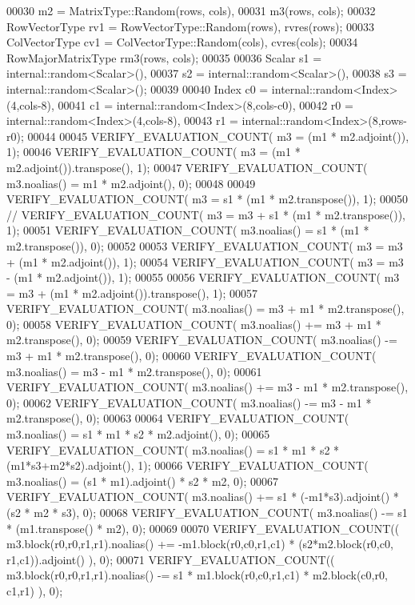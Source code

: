 \begin{DoxyCode}
00030                      m2 = MatrixType::Random(rows, cols),
00031                      m3(rows, cols);
00032   RowVectorType rv1 = RowVectorType::Random(rows), rvres(rows);
00033   ColVectorType cv1 = ColVectorType::Random(cols), cvres(cols);
00034   RowMajorMatrixType rm3(rows, cols);
00035 
00036   Scalar s1 = internal::random<Scalar>(),
00037          s2 = internal::random<Scalar>(),
00038          s3 = internal::random<Scalar>();
00039 
00040   Index c0 = internal::random<Index>(4,cols-8),
00041         c1 = internal::random<Index>(8,cols-c0),
00042         r0 = internal::random<Index>(4,cols-8),
00043         r1 = internal::random<Index>(8,rows-r0);
00044 
00045   VERIFY\_EVALUATION\_COUNT( m3 = (m1 * m2.adjoint()), 1);
00046   VERIFY\_EVALUATION\_COUNT( m3 = (m1 * m2.adjoint()).transpose(), 1);
00047   VERIFY\_EVALUATION\_COUNT( m3.noalias() = m1 * m2.adjoint(), 0);
00048 
00049   VERIFY\_EVALUATION\_COUNT( m3 = s1 * (m1 * m2.transpose()), 1);
00050 \textcolor{comment}{//   VERIFY\_EVALUATION\_COUNT( m3 = m3 + s1 * (m1 * m2.transpose()), 1);}
00051   VERIFY\_EVALUATION\_COUNT( m3.noalias() = s1 * (m1 * m2.transpose()), 0);
00052 
00053   VERIFY\_EVALUATION\_COUNT( m3 = m3 + (m1 * m2.adjoint()), 1);
00054   VERIFY\_EVALUATION\_COUNT( m3 = m3 - (m1 * m2.adjoint()), 1);
00055 
00056   VERIFY\_EVALUATION\_COUNT( m3 = m3 + (m1 * m2.adjoint()).transpose(), 1);
00057   VERIFY\_EVALUATION\_COUNT( m3.noalias() = m3 + m1 * m2.transpose(), 0);
00058   VERIFY\_EVALUATION\_COUNT( m3.noalias() += m3 + m1 * m2.transpose(), 0);
00059   VERIFY\_EVALUATION\_COUNT( m3.noalias() -= m3 + m1 * m2.transpose(), 0);
00060   VERIFY\_EVALUATION\_COUNT( m3.noalias() =  m3 - m1 * m2.transpose(), 0);
00061   VERIFY\_EVALUATION\_COUNT( m3.noalias() += m3 - m1 * m2.transpose(), 0);
00062   VERIFY\_EVALUATION\_COUNT( m3.noalias() -= m3 - m1 * m2.transpose(), 0);
00063 
00064   VERIFY\_EVALUATION\_COUNT( m3.noalias() = s1 * m1 * s2 * m2.adjoint(), 0);
00065   VERIFY\_EVALUATION\_COUNT( m3.noalias() = s1 * m1 * s2 * (m1*s3+m2*s2).adjoint(), 1);
00066   VERIFY\_EVALUATION\_COUNT( m3.noalias() = (s1 * m1).adjoint() * s2 * m2, 0);
00067   VERIFY\_EVALUATION\_COUNT( m3.noalias() += s1 * (-m1*s3).adjoint() * (s2 * m2 * s3), 0);
00068   VERIFY\_EVALUATION\_COUNT( m3.noalias() -= s1 * (m1.transpose() * m2), 0);
00069 
00070   VERIFY\_EVALUATION\_COUNT(( m3.block(r0,r0,r1,r1).noalias() += -m1.block(r0,c0,r1,c1) * (s2*m2.block(r0,c0,
      r1,c1)).adjoint() ), 0);
00071   VERIFY\_EVALUATION\_COUNT(( m3.block(r0,r0,r1,r1).noalias() -= s1 * m1.block(r0,c0,r1,c1) * m2.block(c0,r0,
      c1,r1) ), 0);

\end{DoxyCode}
